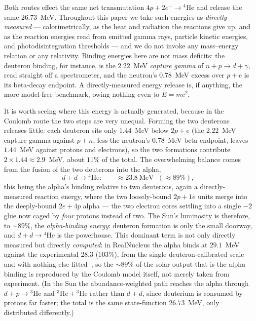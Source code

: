 \documentclass[11pt]{article}
\begin{document}
Both routes effect the same net transmutation $4p+2e^-\to{}^4\mathrm{He}$ and release the same
$26.73$~MeV. Throughout this paper we take such energies as \emph{directly measured} --- calorimetrically,
as the heat and radiation the reactions give up, and as the reaction energies read from emitted gamma
rays, particle kinetic energies, and photodisintegration thresholds --- and we do not invoke any
mass--energy relation or any relativity. Binding energies here are not mass deficits: the deuteron
binding, for instance, is the $2.22$~MeV \emph{capture gamma} of $n+p\to d+\gamma$, read straight off a
spectrometer, and the neutron's $0.78$~MeV excess over $p+e$ is its beta-decay endpoint. A
directly-measured energy release is, if anything, the more model-free benchmark, owing nothing even to
$E=mc^2$.

It is worth seeing where this energy is actually generated, because in the Coulomb route the two steps
are very unequal. Forming the two deuterons releases little: each deuteron sits only $1.44$~MeV below
$2p+e$ (the $2.22$~MeV capture gamma against $p+n$, less the neutron's $0.78$~MeV beta endpoint, leaves
$1.44$~MeV against protons and electrons), so the two formations contribute $2\times1.44\approx2.9$~MeV,
about $11\%$ of the total. The overwhelming balance comes from the fusion of the two deuterons into the
alpha,
\begin{equation}
d + d \to {}^4\mathrm{He}: \qquad \approx 23.8~\text{MeV} \;\; (\approx 89\%),
\end{equation}
this being the alpha's binding relative to two deuterons, again a directly-measured reaction energy,
where the two loosely-bound $2p+1e$ units merge into the deeply-bound $2e+4p$ alpha --- the two electron
cores settling into a single $-2$ glue now caged by \emph{four} protons instead of two. The Sun's
luminosity is therefore, to $\sim\!89\%$, the \emph{alpha-binding energy}: deuteron formation is only
the small doorway, and $d+d\to{}^4\mathrm{He}$ is the powerhouse. This dominant term is not only
directly measured but directly \emph{computed}: in RealNucleus the alpha binds at $29.1$~MeV against the
experimental $28.3$ ($103\%$), from the single deuteron-calibrated scale and with nothing else
fitted~\cite{Johnson-RealNucleus}, so the ${\sim}89\%$ of the solar output that is the alpha binding is
reproduced by the Coulomb model itself, not merely taken from experiment. (In the Sun the abundance-weighted
path reaches the alpha through $d+p\to{}^3\mathrm{He}$ and ${}^3\mathrm{He}+{}^3\mathrm{He}$ rather than
$d+d$, since deuterium is consumed by protons far faster; the total is the same state-function
$26.73$~MeV, only distributed differently.)
\end{document}
